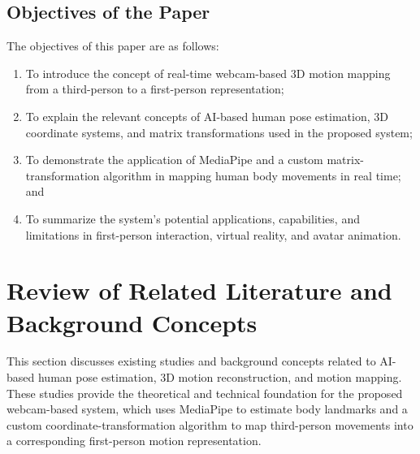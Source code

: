 \documentclass[12pt,a4paper]{article}
\begin{document}
\subsection{Objectives of the Paper}

The objectives of this paper are as follows:

\begin{enumerate}[label=\arabic*.]
    \item To introduce the concept of real-time webcam-based 3D motion mapping from a third-person to a first-person representation;
    \item To explain the relevant concepts of AI-based human pose estimation, 3D coordinate systems, and matrix transformations used in the proposed system;
    \item  To demonstrate the application of MediaPipe and a custom matrix-transformation algorithm in mapping human body movements in real time; and
    \item To summarize the system's potential applications, capabilities, and limitations in first-person interaction, virtual reality, and avatar animation.
\end{enumerate}

\section{Review of Related Literature and Background Concepts}

This section discusses existing studies and background concepts related to AI-based human pose estimation, 3D motion reconstruction, and motion mapping. These studies provide the theoretical and technical foundation for the proposed webcam-based system, which uses MediaPipe to estimate body landmarks and a custom coordinate-transformation algorithm to map third-person movements into a corresponding first-person motion representation.
\end{document}
